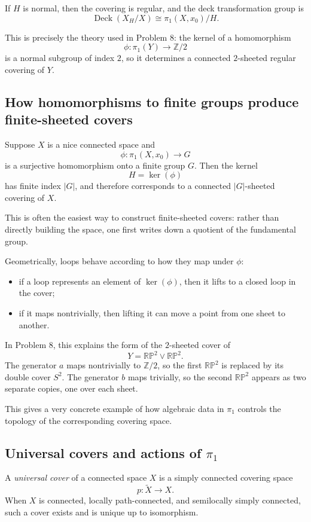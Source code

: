 \documentclass[12pt,a4paper]{article}
\DeclareMathOperator{\Deck}{Deck}
\theoremstyle{notespace}
\begin{document}
If \(H\) is normal, then the covering is regular, and the deck transformation group is
\[
\Deck(X_H/X)\cong \pi_1(X,x_0)/H.
\]

This is precisely the theory used in Problem 8: the kernel of a homomorphism
\[
\phi:\pi_1(Y)\to \mathbb Z/2
\]
is a normal subgroup of index \(2\), so it determines a connected \(2\)-sheeted regular covering of \(Y\).

\subsection{How homomorphisms to finite groups produce finite-sheeted covers}

Suppose \(X\) is a nice connected space and
\[
\phi:\pi_1(X,x_0)\to G
\]
is a surjective homomorphism onto a finite group \(G\). Then the kernel
\[
H=\ker(\phi)
\]
has finite index \(|G|\), and therefore corresponds to a connected \(|G|\)-sheeted covering of \(X\).

This is often the easiest way to construct finite-sheeted covers: rather than directly building the space, one first writes down a quotient of the fundamental group.

Geometrically, loops behave according to how they map under \(\phi\):

\begin{itemize}
	\item if a loop represents an element of \(\ker(\phi)\), then it lifts to a closed loop in the cover;
	\item if it maps nontrivially, then lifting it can move a point from one sheet to another.
\end{itemize}

In Problem 8, this explains the form of the \(2\)-sheeted cover of
\[
Y=\mathbb{RP}^2\vee \mathbb{RP}^2.
\]
The generator \(a\) maps nontrivially to \(\mathbb Z/2\), so the first \(\mathbb{RP}^2\) is replaced by its double cover \(S^2\). The generator \(b\) maps trivially, so the second \(\mathbb{RP}^2\) appears as two separate copies, one over each sheet.

This gives a very concrete example of how algebraic data in \(\pi_1\) controls the topology of the corresponding covering space.

\subsection{Universal covers and actions of \(\pi_1\)}

A \emph{universal cover} of a connected space \(X\) is a simply connected covering space
\[
p:\widetilde X\to X.
\]
When \(X\) is connected, locally path-connected, and semilocally simply connected, such a cover exists and is unique up to isomorphism.
\end{document}
